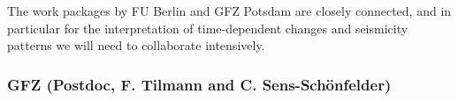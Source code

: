\documentclass[11pt]{article}
\providecommand{\currfilename}{}
\newcommand{\showfile}{{\bf \tt \color{blue} \currfilename}}
\newcommand{\note}[1]{{\it \color{red} #1}}
\newcommand{\noteft}[1]{{\it \color{magenta} FT:#1}}
\newcommand{\note}[1]{}
\newcommand{\noteft}[1]{}
\newcommand{\showfile}{}
\begin{document}
\noindent
The work packages by FU Berlin and GFZ Potsdam are closely connected, and in particular for the interpretation of time-dependent changes and seismicity patterns we will need to collaborate intensively.



\subsubsection{GFZ (Postdoc, F. Tilmann and C. Sens-Schönfelder)}
\showfile
\end{document}
